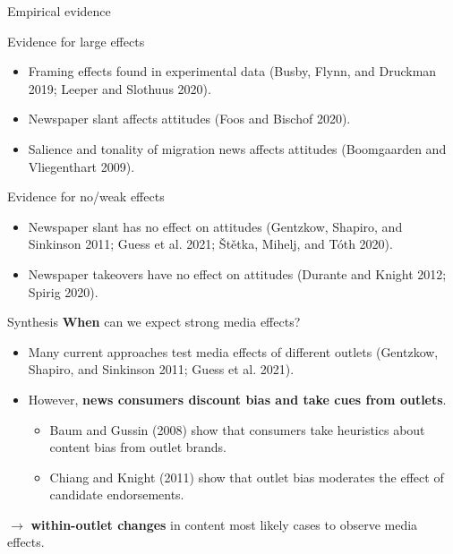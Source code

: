\documentclass[
  ignorenonframetext,
]{beamer}
\providecommand{\tightlist}{%
  \setlength{\itemsep}{0pt}\setlength{\parskip}{0pt}}
\begin{document}
\begin{frame}[allowframebreaks]{Empirical evidence}
\protect\hypertarget{empirical-evidence}{}
\begin{block}{Evidence for large effects}
\protect\hypertarget{evidence-for-large-effects}{}
\begin{itemize}
\tightlist
\item
  Framing effects found in experimental data (Busby, Flynn, and Druckman
  2019; Leeper and Slothuus 2020).
\item
  Newspaper slant affects attitudes (Foos and Bischof 2020).
\item
  Salience and tonality of migration news affects attitudes (Boomgaarden
  and Vliegenthart 2009).
\end{itemize}
\end{block}

\begin{block}{Evidence for no/weak effects}
\protect\hypertarget{evidence-for-noweak-effects}{}
\begin{itemize}
\tightlist
\item
  Newspaper slant has no effect on attitudes (Gentzkow, Shapiro, and
  Sinkinson 2011; Guess et al. 2021; Štětka, Mihelj, and Tóth 2020).
\item
  Newspaper takeovers have no effect on attitudes (Durante and Knight
  2012; Spirig 2020).
\end{itemize}
\end{block}
\end{frame}

\begin{frame}{Synthesis}
\protect\hypertarget{synthesis}{}
\textbf{When} can we expect strong media effects?

\begin{itemize}
\tightlist
\item
  Many current approaches test media effects of different outlets
  (Gentzkow, Shapiro, and Sinkinson 2011; Guess et al. 2021).
\item
  However, \textbf{news consumers discount bias and take cues from
  outlets}.

  \begin{itemize}
  \tightlist
  \item
    Baum and Gussin (2008) show that consumers take heuristics about
    content bias from outlet brands.
  \item
    Chiang and Knight (2011) show that outlet bias moderates the effect
    of candidate endorsements.
  \end{itemize}
\end{itemize}

\(\rightarrow\) \textbf{within-outlet changes} in content most likely
cases to observe media effects.
\end{frame}
\end{document}
